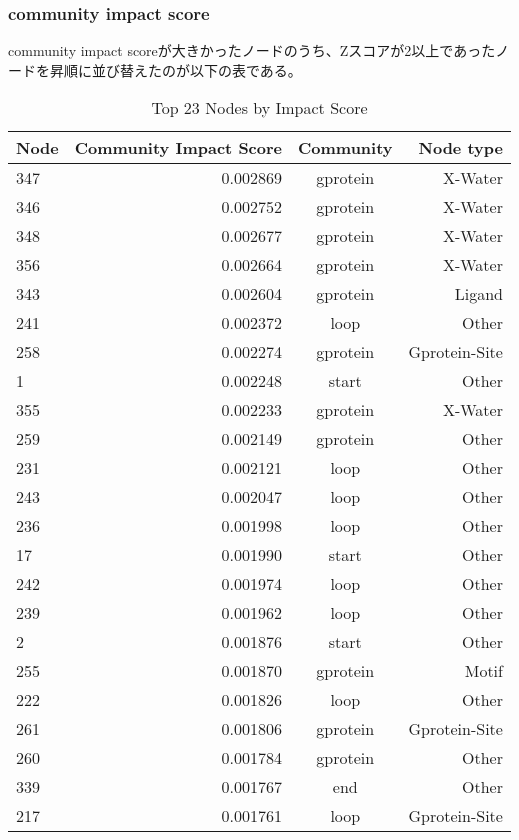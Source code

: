 \subsubsection{community impact score}
community impact scoreが大きかったノードのうち、Zスコアが2以上であったノードを昇順に並び替えたのが以下の表である。
\begin{table}[ht]
    \centering
    \begin{tabular}{|l|r|c|r|}
    \hline
    \textbf{Node} & \textbf{Community Impact Score} & \textbf{Community} & \textbf{Node type}\\
    \hline
    347 & 0.002869 & gprotein & X-Water \\
    346 & 0.002752 & gprotein & X-Water \\
    348 & 0.002677 & gprotein & X-Water \\
    356 & 0.002664 & gprotein & X-Water \\
    343 & 0.002604 & gprotein & Ligand \\
    241 & 0.002372 & loop & Other \\
    258 & 0.002274 & gprotein & Gprotein-Site \\
    1 & 0.002248 & start & Other \\
    355 & 0.002233 & gprotein & X-Water \\
    259 & 0.002149 & gprotein & Other \\
    231 & 0.002121 & loop & Other \\
    243 & 0.002047 & loop & Other \\
    236 & 0.001998 & loop & Other \\
    17 & 0.001990 & start & Other \\
    242 & 0.001974 & loop & Other\\
    239 & 0.001962 & loop & Other \\
    2 & 0.001876 & start & Other \\
    255 & 0.001870 & gprotein & Motif \\
    222 & 0.001826 &  loop & Other \\
    261 & 0.001806 & gprotein & Gprotein-Site \\
    260 & 0.001784 & gprotein & Other \\
    339 & 0.001767 & end & Other \\
    217 & 0.001761 & loop & Gprotein-Site \\
    \hline
    \end{tabular}
    \caption{Top 23 Nodes by Impact Score}
\end{table}
  
